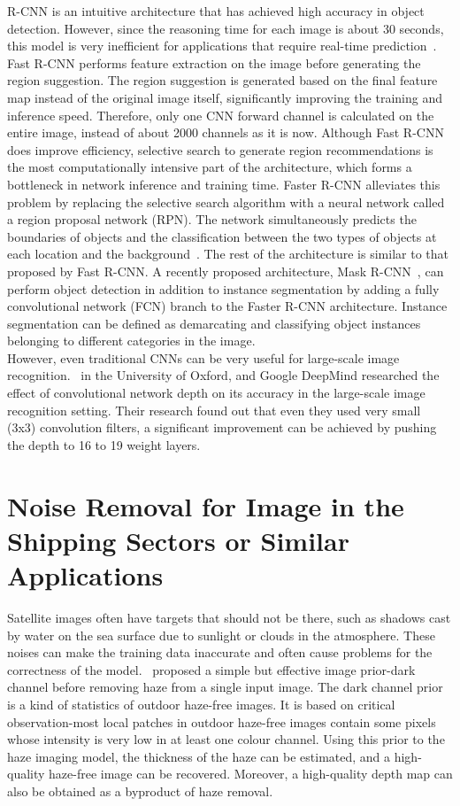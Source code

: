 R-CNN is an intuitive architecture that has achieved high accuracy in object detection. However, since the reasoning time for each image is about 30 seconds, this model is very inefficient for applications that require real-time prediction~\cite{huang2017speed}. Fast R-CNN performs feature extraction on the image before generating the region suggestion. The region suggestion is generated based on the final feature map instead of the original image itself, significantly improving the training and inference speed. Therefore, only one CNN forward channel is calculated on the entire image, instead of about 2000 channels as it is now. Although Fast R-CNN does improve efficiency, selective search to generate region recommendations is the most computationally intensive part of the architecture, which forms a bottleneck in network inference and training time. Faster R-CNN alleviates this problem by replacing the selective search algorithm with a neural network called a region proposal network (RPN). The network simultaneously predicts the boundaries of objects and the classification between the two types of objects at each location and the background~\cite{ren2015faster}. The rest of the architecture is similar to that proposed by Fast R-CNN.
A recently proposed architecture, Mask R-CNN~\cite{he2017mask}, can perform object detection in addition to instance segmentation by adding a fully convolutional network (FCN) branch to the Faster R-CNN architecture. Instance segmentation can be defined as demarcating and classifying object instances belonging to different categories in the image.\\

However, even traditional CNNs can be very useful for large-scale image recognition.~ in the University of Oxford, and Google DeepMind researched the effect of convolutional network depth on its accuracy in the large-scale image recognition setting. Their research found out that even they used very small (3x3) convolution filters, a significant improvement can be achieved by pushing the depth to 16 to 19 weight layers.\\


\section{Noise Removal for Image in the Shipping Sectors or Similar Applications}
Satellite images often have targets that should not be there, such as shadows cast by water on the sea surface due to sunlight or clouds in the atmosphere. These noises can make the training data inaccurate and often cause problems for the correctness of the model.~ proposed a simple but effective image prior-dark channel before removing haze from a single input image. The dark channel prior is a kind of statistics of outdoor haze-free images. It is based on critical observation-most local patches in outdoor haze-free images contain some pixels whose intensity is very low in at least one colour channel. Using this prior to the haze imaging model, the thickness of the haze can be estimated, and a high-quality haze-free image can be recovered. Moreover, a high-quality depth map can also be obtained as a byproduct of haze removal.\\